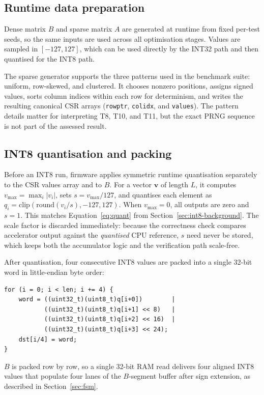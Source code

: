 \subsection{Runtime data preparation}
\label{sec:data-prep}

Dense matrix $B$ and sparse matrix $A$ are generated at runtime from
fixed per-test seeds, so the same inputs are used across all
optimisation stages. Values are sampled in $[-127, 127]$, which can be
used directly by the INT32 path and then quantised for the INT8 path.

The sparse generator supports the three patterns used in the benchmark
suite: uniform, row-skewed, and clustered. It chooses nonzero positions,
assigns signed values, sorts column indices within each row for
determinism, and writes the resulting canonical CSR arrays
(\texttt{rowptr}, \texttt{colidx}, and \texttt{values}). The pattern
details matter for interpreting T8, T10, and T11, but the exact PRNG
sequence is not part of the assessed result.

\subsection{INT8 quantisation and packing}
\label{sec:quant-flow}

Before an INT8 run, firmware applies symmetric runtime quantisation
separately to the CSR values array and to $B$. For a vector
$\mathbf{v}$ of length $L$, it computes $v_{\max} = \max_i |v_i|$,
sets $s = v_{\max}/127$, and quantises each element as
$q_i = \mathrm{clip}(\mathrm{round}(v_i/s), -127, 127)$. When
$v_{\max} = 0$, all outputs are zero and $s = 1$. This matches
Equation~\ref{eq:quant} from Section~\ref{sec:int8-background}. The scale factor is
discarded immediately: because the correctness check compares
accelerator output against the \emph{quantised} CPU reference, $s$
need never be stored, which keeps both the accumulator logic and the
verification path scale-free.

After quantisation, four consecutive INT8 values are packed into a
single 32-bit word in little-endian byte order:
\begin{verbatim}
for (i = 0; i < len; i += 4) {
    word = ((uint32_t)(uint8_t)q[i+0])        |
           ((uint32_t)(uint8_t)q[i+1] << 8)   |
           ((uint32_t)(uint8_t)q[i+2] << 16)  |
           ((uint32_t)(uint8_t)q[i+3] << 24);
    dst[i/4] = word;
}
\end{verbatim}

$B$ is packed row by row, so a single 32-bit RAM read delivers four
aligned INT8 values that populate four lanes of the $B$-segment buffer
after sign extension, as described in Section~\ref{sec:fsm}.

